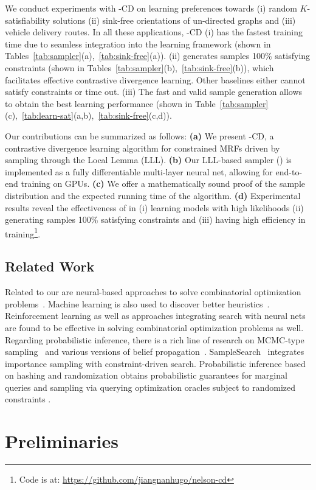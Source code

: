 We conduct experiments with \nls-CD on learning preferences towards (i) random
$K$-satisfiability solutions (ii) sink-free orientations of un-directed graphs
and (iii) vehicle delivery routes.
%
In all these applications, \nls-CD (i) has the fastest training time due to
seamless integration into the learning framework (shown in
Tables~\ref{tab:sampler}(a),~\ref{tab:sink-free}(a)). (ii) \nls generates
samples 100\% satisfying constraints (shown in
Tables~\ref{tab:sampler}(b),~\ref{tab:sink-free}(b)), which facilitates
effective contrastive divergence learning. Other baselines either cannot
satisfy constraints or time out. (iii) The fast and valid sample generation
allows \nls to obtain the best learning performance (shown in
Table~\ref{tab:sampler}(c),~\ref{tab:learn-sat}(a,b),~\ref{tab:sink-free}(c,d)).

Our contributions can be summarized as follows: \textbf{(a)} We present
\nls-CD, a contrastive divergence learning algorithm for constrained MRFs
driven by sampling through the \lovasz Local Lemma (LLL). \textbf{(b)} Our
LLL-based sampler (\nls) is implemented as a fully differentiable multi-layer
neural net, allowing for end-to-end training on GPUs. \textbf{(c)} We offer a
mathematically sound proof of the sample distribution and the expected running
time of the \nls algorithm. \textbf{(d)} Experimental results reveal the
effectiveness of \nls in (i) learning models with high likelihoods (ii)
generating samples 100\% satisfying constraints and (iii) having high
efficiency in training\footnote{Code is at:
    \url{https://github.com/jiangnanhugo/nelson-cd}}.

\subsection{Related Work}

Related to our \nls are neural-based approaches to solve combinatorial
optimization
problems~\citep{DBLP:conf/iclr/SelsamLBLMD19,DBLP:conf/icml/DuanVPRM22,DBLP:conf/nips/LiCK18}.
Machine learning is also used to discover better
heuristics~\citep{DBLP:conf/nips/YolcuP19,DBLP:conf/nips/ChenT19}.%
%
Reinforcement learning
\citep{DBLP:conf/nips/KaraliasL20,DBLP:journals/eor/BengioLP21} as well as
approaches integrating search with neural nets
\citep{DBLP:conf/aaai/MandiDSG20} are found to be effective in solving
combinatorial optimization problems as well.
%
Regarding probabilistic inference, there is a rich line of research on
MCMC-type
sampling~\citep{neal1993probabilistic,DBLP:journals/pami/DagumC93,pmlr-v84-ge18b}
and various versions of belief
propagation~\citep{murphy1999loopy,DBLP:journals/jmlr/IhlerFW05,DBLP:journals/corr/abs-2011-02303,pmlr-v138-fan20a}.
SampleSearch~\citep{DBLP:journals/ai/GogateD11} integrates importance sampling
with constraint-driven search.%
%
Probabilistic inference based on hashing and randomization obtains
probabilistic guarantees for marginal queries and sampling via querying
optimization oracles subject to randomized constraints
\citep{Gomes2006Sampling,Ermon13Wish,DBLP:conf/sat/AchlioptasT17,Chakraborty2013scalable}. \section{Preliminaries} \label{sec:prelim}
